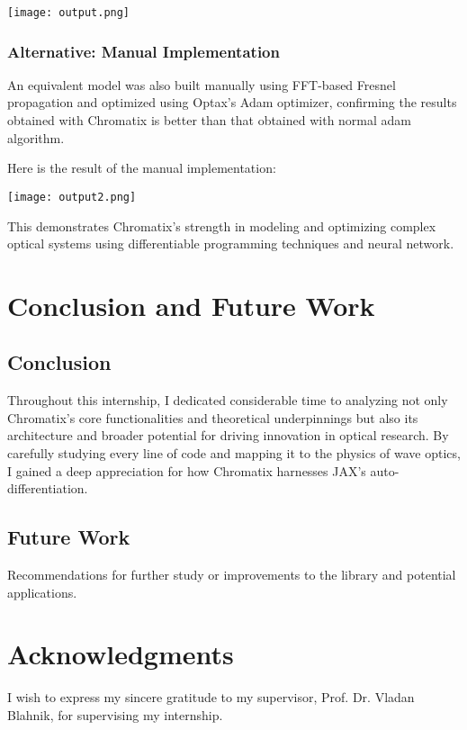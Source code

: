 \documentclass[a4paper,12pt]{report}
\begin{document}
\begin{center}
  \texttt{[image: output.png]}
\end{center}

\subsection{Alternative: Manual Implementation}

An equivalent model was also built manually using FFT-based Fresnel propagation and optimized using Optax's Adam optimizer, confirming the results obtained with Chromatix is better than that obtained with normal adam algorithm.

Here is the result of the manual implementation:

\begin{center}
  \texttt{[image: output2.png]}
\end{center}

This demonstrates Chromatix's strength in modeling and optimizing complex optical systems using differentiable programming techniques and neural network.


\chapter{Conclusion and Future Work}
\section{Conclusion}
Throughout this internship, I dedicated considerable time to analyzing not only Chromatix's core functionalities and theoretical underpinnings but also its architecture and broader potential for driving innovation in optical research. By carefully studying every line of code and mapping it to the physics of wave optics, I gained a deep appreciation for how Chromatix harnesses JAX's auto-differentiation.

\section{Future Work}
Recommendations for further study or improvements to the library and potential applications.

\chapter{Acknowledgments}
I wish to express my sincere gratitude to my supervisor, Prof. Dr. Vladan Blahnik, for supervising my internship. 
\end{document}
